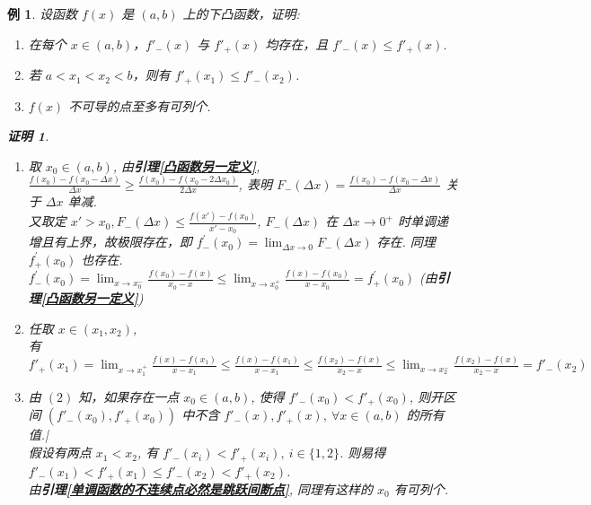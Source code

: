\documentclass{ctexart}
\newcommand{\。}{．} %
\newcommand{\ds}{^\prime}
\newenvironment{zise}{
    \begin{tcolorbox}[enhanced, colback=qzi, boxrule=0pt, frame hidden,
        borderline west={0.7mm}{0.1mm}{szi}]
    }
    {\end{tcolorbox}}
\theoremstyle{t} %
\newtheorem{lthj}{\color{szi} 例}[subsection]
\newtheorem*{zmhj}{\color{slan} 证明}
\newenvironment{lt}{\begin{zise}\begin{lthj}}{\end{lthj}\end{zise}}
\begin{document}
\begin{lt}
    设函数 $f(x)$ 是 $(a, b)$ 上的下凸函数，证明:
    \begin{enumerate}
        \item [(1)] 在每个 $x \in (a, b)$，$f'_-(x)$ 与 $f'_+(x)$ 均存在，且 $f'_-(x) \leqslant f'_+(x)$.
        \item [(2)] 若 $a < x_1 < x_2 < b$，则有 $f'_+(x_1) \leqslant f'_-(x_2)$.
        \item [(3)] $f(x)$ 不可导的点至多有可列个.
    \end{enumerate}
    \begin{zmhj} \quad
        \begin{enumerate}
            \item [(1)] 取 $x_0 \in (a, b)$, 由\textbf{引理\ref{凸函数另一定义}}, $\frac{f(x_0) - f(x_0 - \Delta x)}{\Delta x} \geqslant \frac{f(x_0) - f(x_0 - 2 \Delta x_0)}{2\Delta x}$, 表明 $F_-(\Delta x) = \frac{f(x_0) - f(x_0 - \Delta x)}{\Delta x}$ 关于 $\Delta x$ 单减. \\
            又取定 $x' > x_0, F_-(\Delta x) \leqslant \frac{f(x') - f(x_0)}{x' - x_0}$, $F_-(\Delta x)$ 在 $\Delta x \to 0^+$ 时单调递增且有上界，故极限存在，即 $f\ds_-(x_0) = \lim_{\Delta x \to 0}F_-(\Delta x)$ 存在. 同理 $f\ds_+(x_0)$ 也存在.\\
            $f\ds_-(x_0) = \lim_{x \to x_0^-}\frac{f(x_0) - f(x)}{x_0 - x} \leqslant \lim_{x \to x_0^+}\frac{f(x) - f(x_0)}{x - x_0} = f\ds_+(x_0)$ \quad(由\textbf{引理\ref{凸函数另一定义}}) 
            \item [(2)] 任取 $x \in (x_1, x_2)$, \\
            有 $f'_+(x_1) = \lim_{x \to x_1^+}\frac{f(x) - f(x_1)}{x - x_1} \leqslant \frac{f(x) - f(x_1)}{x - x_1} \leqslant \frac{f(x_2) - f(x)}{x_2 - x} \leqslant \lim_{x \to x_2^-}\frac{f(x_2) - f(x)}{x_2 - x} = f'_-(x_2)$
            \item [(3)] 由 $(2)$ 知，如果存在一点 $x_0 \in (a, b)$, 使得 $f'_-(x_0) < f'_+(x_0)$, 则开区间 $(f'_-(x_0), f'_+(x_0))$ 中不含 $f'_-(x), f'_+(x), \ \forall x \in (a, b)$ 的所有值.|\\
            假设有两点 $x_1 < x_2$, 有 $f'_-(x_i) < f'_+(x_i), \ i \in \{1, 2\}$. 则易得 $f'_-(x_1) < f'_+(x_1) \leqslant f'_-(x_2) < f'_+(x_2)$. \\
            由\textbf{引理\ref{单调函数的不连续点必然是跳跃间断点}}, 同理有这样的 $x_0$ 有可列个. 
        \end{enumerate}
    \end{zmhj}
\end{lt}
\end{document}
